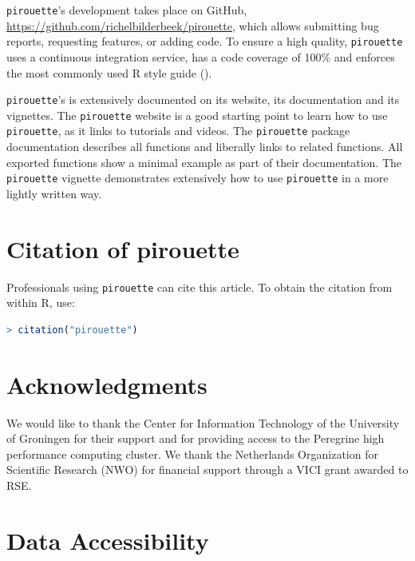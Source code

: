 \verb;pirouette;'s development takes place on GitHub,
\url{https://github.com/richelbilderbeek/pirouette},
which allows submitting bug reports, requesting features, 
or adding code. To ensure a high quality, \verb;pirouette; 
uses a continuous integration service, has a code coverage of 100\%
and enforces the most commonly used R style guide (\cite{style_guide}).

\verb;pirouette;'s is extensively documented on its website,
its documentation and its vignettes.
The \verb;pirouette; website is a good starting point to learn
how to use \verb;pirouette;, as it links to tutorials and videos.
The \verb;pirouette; package documentation describes
all functions and liberally links to related functions.
All exported functions show a minimal example as part of their documentation.
The \verb;pirouette; vignette demonstrates extensively how 
to use \verb;pirouette; in a more lightly written way. 

\section{Citation of pirouette}

Professionals using \verb;pirouette; can cite this
article. To obtain the citation from within R, use:

\begin{lstlisting}[language=R]
> citation("pirouette")
\end{lstlisting}

\section{Acknowledgments}

We would like to thank the Center for Information Technology of the University 
of Groningen for their support and for providing access to the Peregrine 
high performance computing cluster. 
We thank the Netherlands 
Organization for Scientific Research (NWO) for financial support 
through a VICI grant awarded to RSE.

\section{Data Accessibility}

